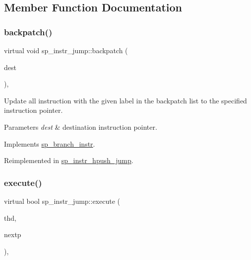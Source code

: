 \subsection{Member Function Documentation}
\mbox{\label{classsp__instr__jump_ad4ac1776111c39aa6d2af89b0ffe0af6}} 
\subsubsection{\texorpdfstring{backpatch()}{backpatch()}}
{\footnotesize\ttfamily virtual void sp\+\_\+instr\+\_\+jump\+::backpatch (\begin{DoxyParamCaption}\item[{uint}]{dest }\end{DoxyParamCaption})\hspace{0.3cm}{\ttfamily [inline]}, {\ttfamily [virtual]}}

Update all instruction with the given label in the backpatch list to the specified instruction pointer.


\begin{DoxyParams}{Parameters}
{\em dest} & destination instruction pointer. \\
\hline
\end{DoxyParams}


Implements \mbox{\hyperlink{classsp__branch__instr_a10bd06254e30634e367405f0fba5ab0d}{sp\+\_\+branch\+\_\+instr}}.



Reimplemented in \mbox{\hyperlink{classsp__instr__hpush__jump_addad7cbed316eb02d7238e07e092c558}{sp\+\_\+instr\+\_\+hpush\+\_\+jump}}.

\mbox{\label{classsp__instr__jump_a2b76438345358e22b6029129828d66d5}} 
\subsubsection{\texorpdfstring{execute()}{execute()}}
{\footnotesize\ttfamily virtual bool sp\+\_\+instr\+\_\+jump\+::execute (\begin{DoxyParamCaption}\item[{T\+HD $\ast$}]{thd,  }\item[{uint $\ast$}]{nextp }\end{DoxyParamCaption})\hspace{0.3cm}{\ttfamily [inline]}, {\ttfamily [virtual]}}

